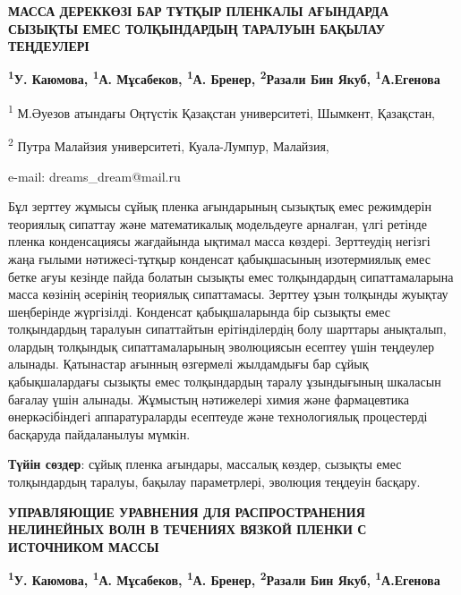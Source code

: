 \begin{articleheader}
{\bfseries МАССА ДЕРЕККӨЗІ БАР ТҰТҚЫР ПЛЕНКАЛЫ АҒЫНДАРДА СЫЗЫҚТЫ ЕМЕС
ТОЛҚЫНДАРДЫҢ ТАРАЛУЫН БАҚЫЛАУ ТЕҢДЕУЛЕРІ}

{\bfseries
\textsuperscript{1}У. Каюмова\textsuperscript{\envelope },
\textsuperscript{1}А. Мұсабеков,
\textsuperscript{1}А. Бренер,
\textsuperscript{2}Разали Бин Якуб,
\textsuperscript{1}А.Егенова
}
\end{articleheader}

\begin{affiliation}
\textsuperscript{1} М.Әуезов атындағы Оңтүстік Қазақстан университеті, Шымкент, Қазақстан,

\textsuperscript{2} Путра Малайзия университеті, Куала-Лумпур, Малайзия,

e-mail: dreams\_dream@mail.ru
\end{affiliation}

Бұл зерттеу жұмысы сұйық пленка ағындарының сызықтық емес режимдерін
теориялық сипаттау және математикалық модельдеуге арналған, үлгі ретінде
пленка конденсациясы жағдайында ықтимал масса көздері. Зерттеудің
негізгі жаңа ғылыми нәтижесі-тұтқыр конденсат қабықшасының изотермиялық
емес бетке ағуы кезінде пайда болатын сызықты емес толқындардың
сипаттамаларына масса көзінің әсерінің теориялық сипаттамасы. Зерттеу
ұзын толқынды жуықтау шеңберінде жүргізілді. Конденсат қабықшаларында
бір сызықты емес толқындардың таралуын сипаттайтын ерітінділердің болу
шарттары анықталып, олардың толқындық сипаттамаларының эволюциясын
есептеу үшін теңдеулер алынады. Қатынастар ағынның өзгермелі жылдамдығы
бар сұйық қабықшалардағы сызықты емес толқындардың таралу ұзындығының
шкаласын бағалау үшін алынады. Жұмыстың нәтижелері химия және
фармацевтика өнеркәсібіндегі аппаратураларды есептеуде және
технологиялық процестерді басқаруда пайдаланылуы мүмкін.

{\bfseries Түйін сөздер}: сұйық пленка ағындары, массалық көздер, сызықты
емес толқындардың таралуы, бақылау параметрлері, эволюция теңдеуін
басқару.

\begin{articleheader}
{\bfseries УПРАВЛЯЮЩИЕ УРАВНЕНИЯ ДЛЯ РАСПРОСТРАНЕНИЯ НЕЛИНЕЙНЫХ ВОЛН В
ТЕЧЕНИЯХ ВЯЗКОЙ ПЛЕНКИ С ИСТОЧНИКОМ МАССЫ}

{\bfseries \textsuperscript{1}У. Каюмова\textsuperscript{\envelope },
\textsuperscript{1}А. Мұсабеков, \textsuperscript{1}А. Бренер,
\textsuperscript{2}Разали Бин Якуб, \textsuperscript{1}А.Егенова}
\end{articleheader}

